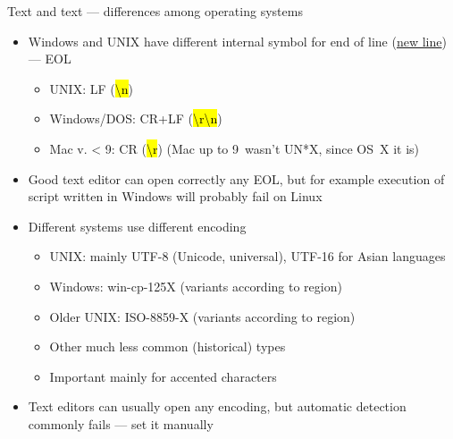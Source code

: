 \documentclass[compress, ucs, xelatex, 11pt, xcolor=svgnames,
  hyperref={
    bookmarks=true,
    unicode=true,
    colorlinks=true,
    pdftitle={Linux, command line and MetaCentrum},
    plainpages=false,
    pdfauthor={Vojtech Zeisek},
    pdfsubject={Course about use of Linux command line, writing shell scripts and using MetaCentrum of CESNET},
    pdfcreator={XeLaTeX},
    pdfkeywords={Linux, GNU, BASH, shell, command line, MetaCentrum},
    linkcolor=DarkRed,
    anchorcolor=DarkBlue,
    citecolor=Indigo,
    filecolor=NavyBlue,
    menucolor=DarkMagenta,
    urlcolor=DarkBlue,
    pdftex},
  url={hyphens, lowtilde} %
  ]{beamer}
\renewcommand{\texttt}[1]{\hl{\ttfamily #1}}
\begin{document}
\begin{frame}{Text and text --- differences among operating systems}
  \label{eolenc}
  \begin{itemize}
    \item Windows and UNIX have different internal symbol for end of line (\href{https://en.wikipedia.org/wiki/Newline}{new line}) --- EOL
    \begin{itemize}
      \item UNIX: LF (\texttt{\textbackslash n})
      \item Windows/DOS: CR+LF (\texttt{\textbackslash r\textbackslash n})
      \item Mac v. < 9: CR (\texttt{\textbackslash r}) (Mac up to 9~wasn't UN*X, since OS~X it is)
    \end{itemize}
    \item Good text editor can open correctly any EOL, but for example execution of script written in Windows will probably fail on Linux
    \item Different systems use different encoding
    \begin{itemize}
      \item UNIX: mainly UTF-8 (Unicode, universal), UTF-16 for Asian languages
      \item Windows: win-cp-125X (variants according to region)
      \item Older UNIX: ISO-8859-X (variants according to region)
      \item Other much less common (historical) types
      \item Important mainly for accented characters
    \end{itemize}
    \item Text editors can usually open any encoding, but automatic detection commonly fails --- set it manually
  \end{itemize}
\end{frame}
\end{document}
